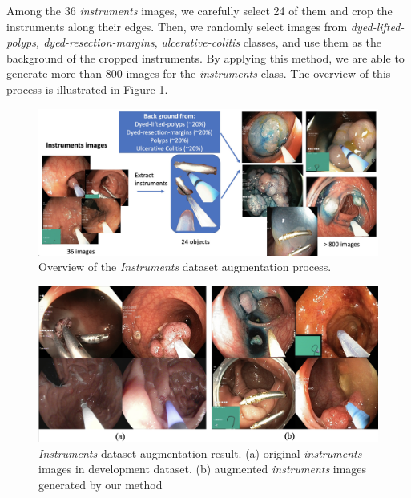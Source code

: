 Among the 36 \textit{instruments} images, we carefully select 24 of them and crop the instruments along their edges. Then, we randomly select images from \textit{dyed-lifted-polyps, dyed-resection-margins}, \textit{ulcerative-colitis} classes, and use them as the background of the cropped instruments. By applying this method, we are able to generate more than 800 images for the \textit{instruments} class. The overview of this process is illustrated in Figure \ref{fig:instruments_augment}.

\begin{figure}[thb]
\begin{center}
\includegraphics[width=\textwidth]{endoscopy_resources/instruments_augmentation.png}
\end{center}
   \caption{Overview of the \textit{Instruments} dataset augmentation process.}
\label{fig:instruments_augment}
\end{figure}

\begin{figure}[thb]
\begin{center}
\includegraphics[width=\textwidth]{endoscopy_resources/instr_augment_compare.png}
\end{center}
   \caption{\textit{Instruments} dataset augmentation result. (a) original \textit{instruments} images in development dataset. (b) augmented \textit{instruments} images generated by our method}
\label{fig:instruments_augment_compare}
\end{figure}

